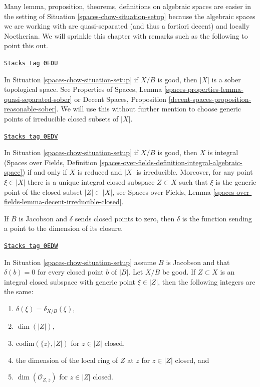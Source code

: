 \medskip\noindent
Many lemma, proposition, theorems, definitions on algebraic spaces
are easier in the setting of Situation \ref{spaces-chow-situation-setup} because
the algebraic spaces we are working with are quasi-separated
(and thus a fortiori decent) and locally Noetherian. We will sprinkle
this chapter with remarks such as the following to point this out.

\begin{remark}[Sober]
\label{spaces-chow-remark-sober}
\href{https://stacks.math.columbia.edu/tag/0EDU}{\texttt{Stacks tag 0EDU}}

In Situation \ref{spaces-chow-situation-setup} if $X/B$ is good, then
$|X|$ is a sober topological space. See
Properties of Spaces, Lemma \ref{spaces-properties-lemma-quasi-separated-sober}
or Decent Spaces, Proposition \ref{decent-spaces-proposition-reasonable-sober}.
We will use this without further mention
to choose generic points of irreducible closed subsets of $|X|$.
\end{remark}

\begin{remark}[Integral]
\label{spaces-chow-remark-integral}
\href{https://stacks.math.columbia.edu/tag/0EDV}{\texttt{Stacks tag 0EDV}}

In Situation \ref{spaces-chow-situation-setup} if $X/B$ is good, then
$X$ is integral (Spaces over Fields, Definition
\ref{spaces-over-fields-definition-integral-algebraic-space})
if and only if $X$ is reduced and $|X|$ is irreducible.
Moreover, for any point $\xi \in |X|$ there is a unique integral closed
subspace $Z \subset X$ such that $\xi$ is the generic point
of the closed subset $|Z| \subset |X|$, see
Spaces over Fields, Lemma
\ref{spaces-over-fields-lemma-decent-irreducible-closed}.
\end{remark}

If $B$ is Jacobson and $\delta$ sends closed points to zero, then $\delta$
is the function sending a point to the dimension of its closure.

\begin{lemma}
\label{spaces-chow-lemma-delta-is-dimension}
\href{https://stacks.math.columbia.edu/tag/0EDW}{\texttt{Stacks tag 0EDW}}

In Situation \ref{spaces-chow-situation-setup} assume $B$ is Jacobson
and that $\delta(b) = 0$ for every closed point $b$ of $|B|$.
Let $X/B$ be good. If $Z \subset X$ is an integral closed subspace
with generic point $\xi \in |Z|$, then the following integers are the same:
\begin{enumerate}
\item $\delta(\xi) = \delta_{X/B}(\xi)$,
\item $\dim(|Z|)$,
\item $\text{codim}(\{z\}, |Z|)$ for $z \in |Z|$ closed,
\item the dimension of the local ring of $Z$ at $z$ for
$z \in |Z|$ closed, and
\item $\dim(\mathcal{O}_{Z, \overline{z}})$ for $z \in |Z|$ closed.
\end{enumerate}
\end{lemma}

